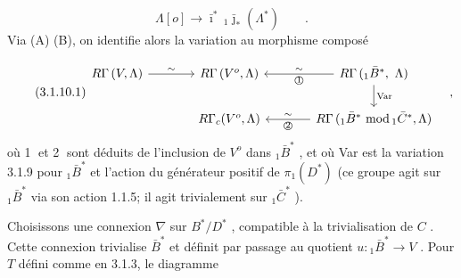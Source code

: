 \begin{equation*}
\Lambda[o] \longrightarrow \bar{\imath}^*\, {}_1\bar{\jmath}_*(\Lambda^*) \qquad .
\end{equation*}
Via (A) (B), on identifie alors la variation au morphisme composé

\begin{equation}\tag{3.1.10.1}
\begin{tikzcd}[column sep=large]
R\Gamma\,(V,\Lambda) \arrow[r, "\sim"] & R\Gamma\,(V^o,\Lambda) & R\Gamma\,({}_1\bar{B}^*,\ \Lambda) \arrow[l, "\sim"', "\text{\textcircled{1}}"] \arrow[d, "\mathrm{Var}"] \\
{} & R\Gamma_c(V^o,\Lambda) & R\Gamma\,({}_1\bar{B}^*\ \mathrm{mod}\,{}_1\bar{C}^*,\Lambda) \arrow[l, "\sim"', "\text{\textcircled{2}}"]
\end{tikzcd}\quad ,
\end{equation}
où \textcircled{1} et \textcircled{2} sont déduits de l'inclusion de $V^o$ dans ${}_1\bar{B}^*$ , et où Var est la variation 3.1.9 pour ${}_1\bar{B}^*$ et l'action du générateur positif de $\pi_1(D^*)$ (ce groupe agit sur ${}_1\bar{B}^*$ via son action 1.1.5; il agit trivialement sur ${}_1\bar{C}^*$ ).

Choisissons une connexion $\nabla$ sur $B^*/D^*$ , compatible à la trivialisation de $C$ . Cette connexion trivialise $\bar{B}^*$ et définit par passage au quotient $u : {}_1\bar{B}^* \longrightarrow V$ . Pour $T$ défini comme en 3.1.3, le diagramme 


